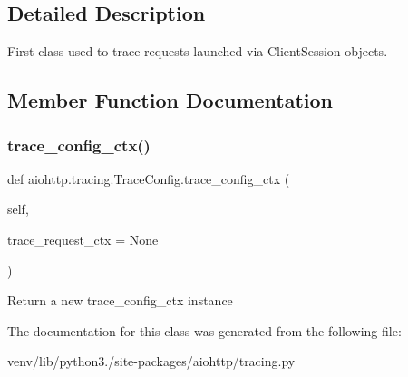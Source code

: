 \subsection{Detailed Description}
\begin{DoxyVerb}First-class used to trace requests launched via ClientSession
objects.\end{DoxyVerb}
 

\subsection{Member Function Documentation}
\mbox{\label{classaiohttp_1_1tracing_1_1_trace_config_a6dd81a14ce87b3d96b7997c64e666fa6}} 
\subsubsection{\texorpdfstring{trace\+\_\+config\+\_\+ctx()}{trace\_config\_ctx()}}
{\footnotesize\ttfamily def aiohttp.\+tracing.\+Trace\+Config.\+trace\+\_\+config\+\_\+ctx (\begin{DoxyParamCaption}\item[{}]{self,  }\item[{}]{trace\+\_\+request\+\_\+ctx = {\ttfamily None} }\end{DoxyParamCaption})}

\begin{DoxyVerb}Return a new trace_config_ctx instance \end{DoxyVerb}
 

The documentation for this class was generated from the following file\+:\begin{DoxyCompactItemize}
\item 
venv/lib/python3./site-\/packages/aiohttp/tracing.\+py\end{DoxyCompactItemize}
